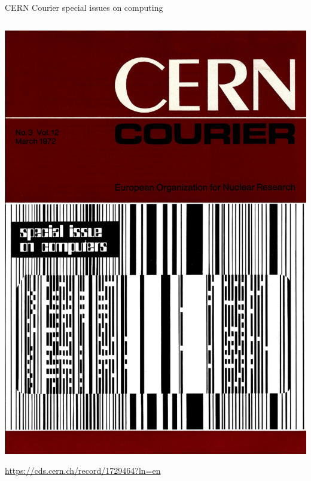 \documentclass[aspectratio=169]{beamer}
\begin{document}
\begin{frame}{CERN Courier special issues on computing}
\begin{columns}
\begin{center}
\vspace{0.2 cm}
\includegraphics[width=0.55\linewidth]{cern-courier-2.png}

\vspace{0.2 cm}
\scriptsize
\textcolor{blue}{\url{https://cds.cern.ch/record/1729464?ln=en}}
\end{center}
\end{columns}
\end{frame}
\end{document}
